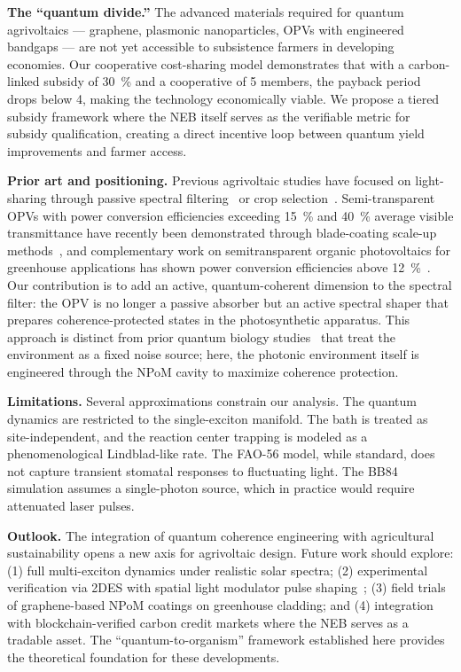 \documentclass[twocolumn]{article}
\begin{document}
\textbf{The ``quantum divide.''} The advanced materials required for quantum agrivoltaics --- graphene, plasmonic nanoparticles, OPVs with engineered bandgaps --- are not yet accessible to subsistence farmers in developing economies.
Our cooperative cost-sharing model demonstrates that with a carbon-linked subsidy of \SI{30}{\percent} and a cooperative of 5 members, the payback period drops below \SI{4}{\yr}, making the technology economically viable.
We propose a tiered subsidy framework where the NEB itself serves as the verifiable metric for subsidy qualification, creating a direct incentive loop between quantum yield improvements and farmer access.

\textbf{Prior art and positioning.} Previous agrivoltaic studies have focused on light-sharing through passive spectral filtering~\cite{Thompson2020} or crop selection~\cite{Dupraz2011}.
Semi-transparent OPVs with power conversion efficiencies exceeding \SI{15}{\percent} and \SI{40}{\percent} average visible transmittance have recently been demonstrated through blade-coating scale-up methods~\cite{Ravishankar2024}, and complementary work on semitransparent organic photovoltaics for greenhouse applications has shown power conversion efficiencies above \SI{12}{\percent}~\cite{Alshareef2024}.
Our contribution is to add an active, quantum-coherent dimension to the spectral filter: the OPV is no longer a passive absorber but an active spectral shaper that prepares coherence-protected states in the photosynthetic apparatus.
This approach is distinct from prior quantum biology studies~\cite{Scholes2015} that treat the environment as a fixed noise source; here, the photonic environment itself is engineered through the NPoM cavity to maximize coherence protection.

\textbf{Limitations.} Several approximations constrain our analysis.
The quantum dynamics are restricted to the single-exciton manifold.
The bath is treated as site-independent, and the reaction center trapping is modeled as a phenomenological Lindblad-like rate.
The FAO-56 model, while standard, does not capture transient stomatal responses to fluctuating light.
The BB84 simulation assumes a single-photon source, which in practice would require attenuated laser pulses.

\textbf{Outlook.} The integration of quantum coherence engineering with agricultural sustainability opens a new axis for agrivoltaic design.
Future work should explore: (1) full multi-exciton dynamics under realistic solar spectra; (2) experimental verification via 2DES with spatial light modulator pulse shaping~\cite{Gunthardt2023,Sebastian2024}; (3) field trials of graphene-based NPoM coatings on greenhouse cladding; and (4) integration with blockchain-verified carbon credit markets where the NEB serves as a tradable asset.
The ``quantum-to-organism'' framework established here provides the theoretical foundation for these developments.
\end{document}
